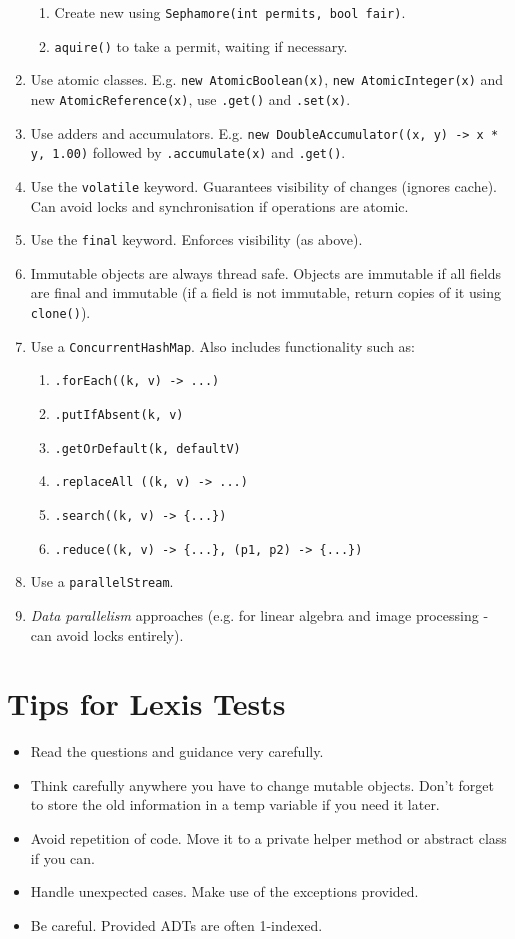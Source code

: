 \documentclass[twocolumn,english]{article}
\begin{document}
\begin{enumerate}
\begin{enumerate}
\item Create new using \texttt{Sephamore(int permits, bool fair)}.
\item \texttt{aquire()} to take a permit, waiting if necessary.
\end{enumerate}
\item Use atomic classes. E.g. \texttt{new AtomicBoolean(x)}, \texttt{new
AtomicInteger(x)} and new \texttt{AtomicReference(x)}, use \texttt{.get()}
and \texttt{.set(x)}.
\item Use adders and accumulators. E.g. \texttt{new DoubleAccumulator((x,
y) -\textgreater{} x {*} y, 1.00)} followed by \texttt{.accumulate(x)}
and \texttt{.get()}.
\item Use the \texttt{volatile} keyword. Guarantees visibility of changes
(ignores cache). Can avoid locks and synchronisation if operations
are atomic.
\item Use the \texttt{final} keyword. Enforces visibility (as above).
\item Immutable objects are always thread safe. Objects are immutable if
all fields are final and immutable (if a field is not immutable, return
copies of it using \texttt{clone()}).
\item Use a \texttt{ConcurrentHashMap}. Also includes functionality such
as:

\begin{enumerate}
\item \texttt{.forEach((k, v) -\textgreater{} ...)}
\item \texttt{.putIfAbsent(k, v)}
\item \texttt{.getOrDefault(k, defaultV)}
\item \texttt{.replaceAll ((k, v) -\textgreater{} ...)}
\item \texttt{.search((k, v) -\textgreater{} \{...\})}
\item \texttt{.reduce((k, v) -\textgreater{} \{...\}, (p1, p2) -\textgreater{}
\{...\})}
\end{enumerate}
\item Use a \texttt{parallelStream}.
\item \emph{Data parallelism} approaches (e.g. for linear algebra and image
processing - can avoid locks entirely).
\end{enumerate}

\section{Tips for Lexis Tests}
\begin{itemize}
\item Read the questions and guidance very carefully.
\item Think carefully anywhere you have to change mutable objects. Don't
forget to store the old information in a temp variable if you need
it later.
\item Avoid repetition of code. Move it to a private helper method or abstract
class if you can.
\item Handle unexpected cases. Make use of the exceptions provided.
\item Be careful. Provided ADTs are often 1-indexed.\end{itemize}
\end{document}
